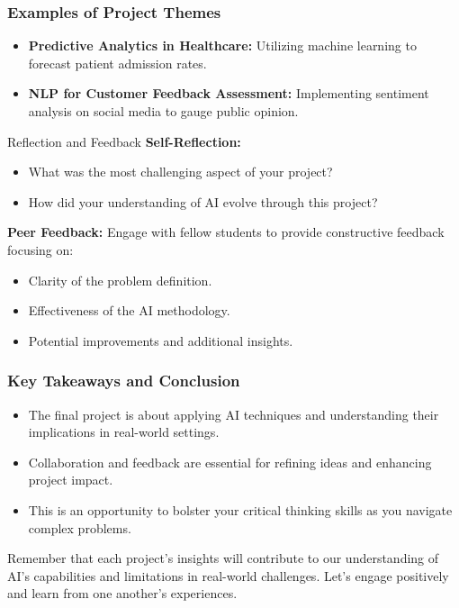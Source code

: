 \documentclass[aspectratio=169]{beamer}
\begin{document}
\begin{frame}[fragile]
    \frametitle{Examples of Project Themes}
    \begin{itemize}
        \item \textbf{Predictive Analytics in Healthcare:} Utilizing machine learning to forecast patient admission rates.
        \item \textbf{NLP for Customer Feedback Assessment:} Implementing sentiment analysis on social media to gauge public opinion.
    \end{itemize}

    \begin{block}{Reflection and Feedback}
        \textbf{Self-Reflection:}
        \begin{itemize}
            \item What was the most challenging aspect of your project?
            \item How did your understanding of AI evolve through this project?
        \end{itemize}
        
        \textbf{Peer Feedback:}
        Engage with fellow students to provide constructive feedback focusing on:
        \begin{itemize}
            \item Clarity of the problem definition.
            \item Effectiveness of the AI methodology.
            \item Potential improvements and additional insights.
        \end{itemize}
    \end{block}
\end{frame}

\begin{frame}[fragile]
    \frametitle{Key Takeaways and Conclusion}
    \begin{itemize}
        \item The final project is about applying AI techniques and understanding their implications in real-world settings.
        \item Collaboration and feedback are essential for refining ideas and enhancing project impact.
        \item This is an opportunity to bolster your critical thinking skills as you navigate complex problems.
    \end{itemize}
    
    Remember that each project's insights will contribute to our understanding of AI's capabilities and limitations in real-world challenges. Let's engage positively and learn from one another's experiences.
\end{frame}
\end{document}
